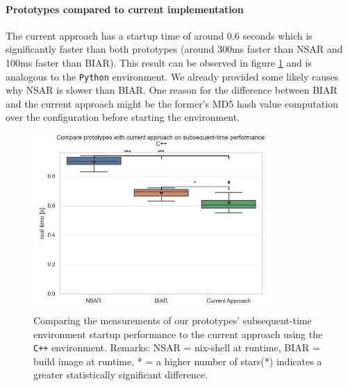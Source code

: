 \paragraph{Prototypes compared to current implementation}
The current approach has a startup time of around 0.6 seconds which is significantly faster than both prototypes (around 300ms faster than NSAR and 100ms faster than BIAR). This result can be observed in figure \ref{fig:subsequent-time-build-cpp} and is analogous to the \verb|Python| environment. We already provided some likely causes why NSAR is slower than BIAR. One reason for the difference between BIAR and the current approach might be the former's MD5 hash value computation over the configuration before starting the environment.

\begin{figure}[h!]
  \centering
  \includegraphics[width=0.8\textwidth]{thesis/graphics/compare-plots/compare_prototypes_with_current_approach_on_subsequent-time_performance:_c++.png}
  \caption{Comparing the measurements of our prototypes' subsequent-time environment startup performance to the current approach using the \texttt{C++} environment. Remarks: NSAR = nix-shell at runtime, BIAR = build image at runtime, * = a higher number of stars(*) indicates a greater statistically significant difference.}
  \label{fig:subsequent-time-build-cpp}
\end{figure}


